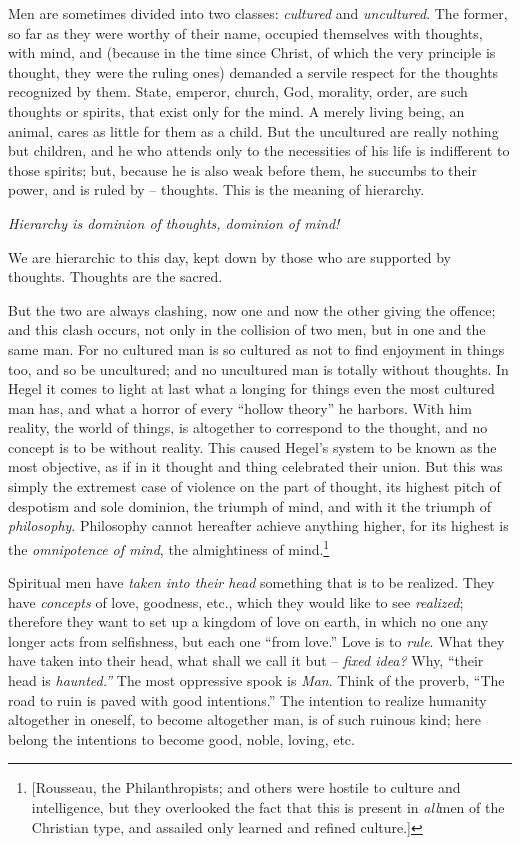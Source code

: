Men are sometimes divided into two classes: \textit{cultured} and 
\textit{uncultured}. The former, so far as they were worthy of their name, 
occupied themselves with thoughts, with mind, and (because in the time since 
Christ, of which the very principle is thought, they were the ruling ones) 
demanded a servile respect for the thoughts recognized by them. State, 
emperor, church, God, morality, order, are such thoughts or spirits, that 
exist only for the mind. A merely living being, an animal, cares as little for 
them as a child. But the uncultured are really nothing but children, and he 
who attends only to the necessities of his life is indifferent to those 
spirits; but, because he is also weak before them, he succumbs to their power, 
and is ruled by -- thoughts. This is the meaning of hierarchy.

\textit{Hierarchy is dominion of thoughts, dominion of mind!}

We are hierarchic to this day, kept down by those who are supported by 
thoughts. Thoughts are the sacred.

But the two are always clashing, now one and now the other giving the offence; 
and this clash occurs, not only in the collision of two men, but in one and 
the same man. For no cultured man is so cultured as not to find enjoyment in 
things too, and so be uncultured; and no uncultured man is totally without 
thoughts. In Hegel it comes to light at last what a longing for things even 
the most cultured man has, and what a horror of every ``hollow theory'' he 
harbors. With him reality, the world of things, is altogether to correspond to 
the thought, and no concept is to be without reality. This caused Hegel's 
system to be known as the most objective, as if in it thought and thing 
celebrated their union. But this was simply the extremest case of violence on 
the part of thought, its highest pitch of despotism and sole dominion, the 
triumph of mind, and with it the triumph of \textit{philosophy}. Philosophy 
cannot hereafter achieve anything higher, for its highest is the 
\textit{omnipotence of mind}, the almightiness of mind.\footnote{[Rousseau, 
the Philanthropists; and others were hostile to culture and intelligence, but 
they overlooked the fact that this is present in \textit{all}men of the 
Christian type, and assailed only learned and refined culture.]}

Spiritual men have \textit{taken into their head} something that is to be 
realized. They have \textit{concepts} of love, goodness, etc., which they 
would like to see \textit{realized}; therefore they want to set up a kingdom 
of love on earth, in which no one any longer acts from selfishness, but each 
one ``from love.'' Love is to \textit{rule}. What they have taken into their 
head, what shall we call it but -- \textit{fixed idea?} Why, ``their head is 
\textit{haunted.''} The most oppressive spook is \textit{Man}. Think of the 
proverb, ``The road to ruin is paved with good intentions.'' The intention 
to realize humanity altogether in oneself, to become altogether man, is of 
such ruinous kind; here belong the intentions to become good, noble, loving, 
etc.

